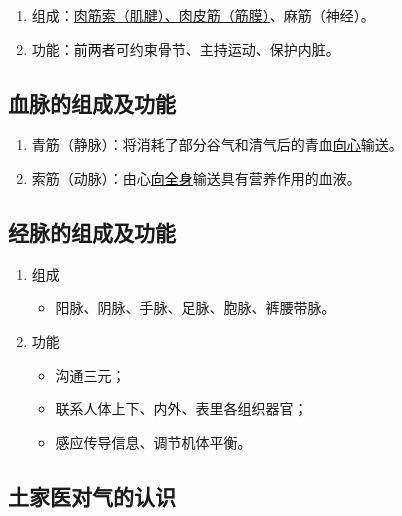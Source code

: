 \documentclass[cn,black,12pt,normal,founder]{elegantnote}
\newcommand{\redt}[1]{\textcolor{black}{{}#1}}      %
\begin{document}
\begin{enumerate}
  \item 组成：\uline{肉筋索（肌腱）、肉皮筋（筋膜）}、麻筋（神经）。
  \item 功能：\redt{前两者}可约束骨节、主持运动、保护内脏。
\end{enumerate}

\subsection{血脉的组成及功能}

\begin{enumerate}
  \item 青筋（静脉）：将消耗了部分谷气和清气后的青血\redt{\uline{向心}}输送。
  \item 索筋（动脉）：由心\redt{\uline{向全身}}输送具有营养作用的血液。
\end{enumerate}

\subsection{经脉的组成及功能}

\begin{enumerate}
  \item 组成
  \begin{itemize}
    \item 阳脉、阴脉、手脉、足脉、胞脉、裤腰带脉。
  \end{itemize}
  \item 功能
  \begin{itemize}
    \item 沟通三元；
    \item 联系人体上下、内外、表里各组织器官；
    \item 感应传导信息、调节机体平衡。
  \end{itemize}
\end{enumerate}

\subsection{土家医对气的认识}
\end{document}
